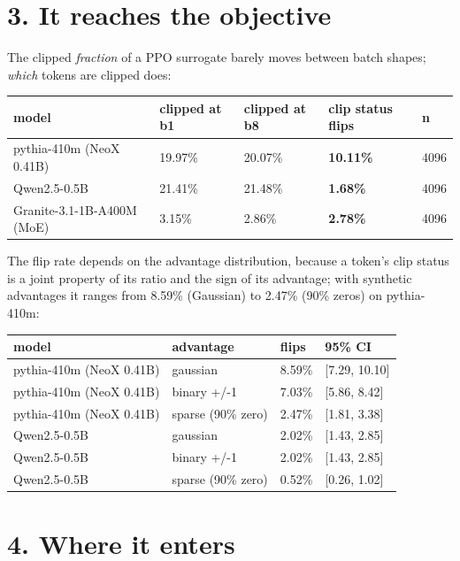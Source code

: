 \documentclass[
  10pt,
]{article}
\begin{document}
\hypertarget{it-reaches-the-objective}{%
\section{3. It reaches the objective}\label{it-reaches-the-objective}}

The clipped \emph{fraction} of a PPO surrogate barely moves between
batch shapes; \emph{which} tokens are clipped does:

\begin{longtable}[]{@{}lllll@{}}
\toprule
model & clipped at b1 & clipped at b8 & clip status flips & n \\
\midrule
\endhead
pythia-410m (NeoX 0.41B) & 19.97\% & 20.07\% & \textbf{10.11\%} &
4096 \\
Qwen2.5-0.5B & 21.41\% & 21.48\% & \textbf{1.68\%} & 4096 \\
Granite-3.1-1B-A400M (MoE) & 3.15\% & 2.86\% & \textbf{2.78\%} & 4096 \\
\bottomrule
\end{longtable}

The flip rate depends on the advantage distribution, because a token's
clip status is a joint property of its ratio and the sign of its
advantage; with synthetic advantages it ranges from 8.59\% (Gaussian) to
2.47\% (90\% zeros) on pythia-410m:

\begin{longtable}[]{@{}llll@{}}
\toprule
model & advantage & flips & 95\% CI \\
\midrule
\endhead
pythia-410m (NeoX 0.41B) & gaussian & 8.59\% & {[}7.29, 10.10{]} \\
pythia-410m (NeoX 0.41B) & binary +/-1 & 7.03\% & {[}5.86, 8.42{]} \\
pythia-410m (NeoX 0.41B) & sparse (90\% zero) & 2.47\% & {[}1.81,
3.38{]} \\
Qwen2.5-0.5B & gaussian & 2.02\% & {[}1.43, 2.85{]} \\
Qwen2.5-0.5B & binary +/-1 & 2.02\% & {[}1.43, 2.85{]} \\
Qwen2.5-0.5B & sparse (90\% zero) & 0.52\% & {[}0.26, 1.02{]} \\
\bottomrule
\end{longtable}

\hypertarget{where-it-enters}{%
\section{4. Where it enters}\label{where-it-enters}}
\end{document}
